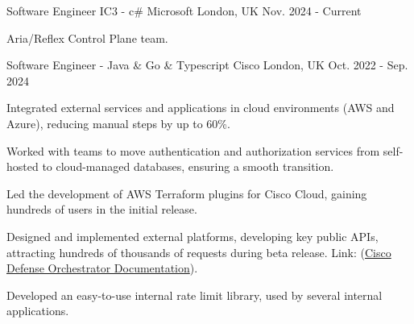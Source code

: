 

\begin{cventries}


\cventry
    {Software Engineer IC3 - c\#} %
    {Microsoft} %
    {London, UK} %
    {Nov. 2024 - Current} %
    {
      \begin{cvitems} %
        \item {Aria/Reflex Control Plane team.}
      \end{cvitems}
    }


\cventry
    {Software Engineer - Java \& Go \& Typescript} %
    {Cisco} %
    {London, UK} %
    {Oct. 2022 - Sep. 2024} %
    {
      \begin{cvitems} %
        \item {Integrated external services and applications in cloud environments (AWS and Azure), reducing manual steps by up to 60\%.}
        \item {Worked with teams to move authentication and authorization services from self-hosted to cloud-managed databases, ensuring a smooth transition.}
        \item {Led the development of AWS Terraform plugins for Cisco Cloud, gaining hundreds of users in the initial release.}
        \item {Designed and implemented external platforms, developing key public APIs, attracting hundreds of thousands of requests during beta release. Link: (\href{https://developer.cisco.com/docs/cisco-defense-orchestrator/}{Cisco Defense Orchestrator Documentation}).}
        \item {Developed an easy-to-use internal rate limit library, used by several internal applications.}
      \end{cvitems}
    }


\end{cventries}
